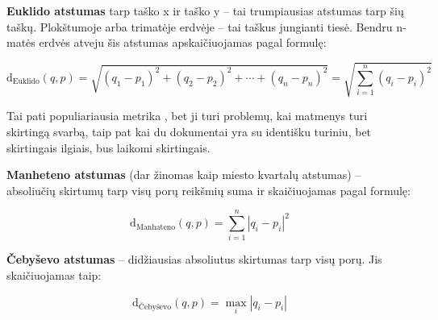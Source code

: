 \documentclass{VUMIFInfKursinis}
\begin{document}
\textbf{Euklido atstumas} tarp taško x ir taško y – tai trumpiausias atstumas
tarp šių taškų. Plokštumoje arba trimatėje erdvėje – tai taškus
jungianti tiesė. Bendru n-matės erdvės atveju šis atstumas
apskaičiuojamas pagal formulę:

$$ \mathrm{d_{Euklido}} (q,p) 
	= {\sqrt {(q_{1}-p_{1})^{2}+(q_{2}-p_{2})^{2}+\cdots +(q_{n}-p_{n})^{2}}}
	=\sqrt {\sum _{i=1}^{n}(q_{i}-p_{i})^{2}} $$

Tai pati populiariausia metrika \cite{jain1988algorithms}, bet ji turi problemų, kai
matmenys turi skirtingą svarbą, taip pat kai du dokumentai yra su
identišku turiniu, bet skirtingais ilgiais, bus laikomi skirtingais.

\textbf{Manheteno atstumas} (dar žinomas kaip miesto kvartalų atstumas)
– absoliučių skirtumų tarp visų porų reikšmių suma ir skaičiuojamas
pagal formulę:

$$ \mathrm{d_{Manhateno}} (q,p)
	=\sum _{i=1}^{n}|q_{i}-p_{i}|^2 $$

\textbf{Čebyševo atstumas} – didžiausias absoliutus skirtumas tarp visų
porų. Jis skaičiuojamas taip:

$$ \mathrm{d_{Čebyševo}} (q,p)
	=\max_i|q_{i}-p_{i}| $$
\end{document}
